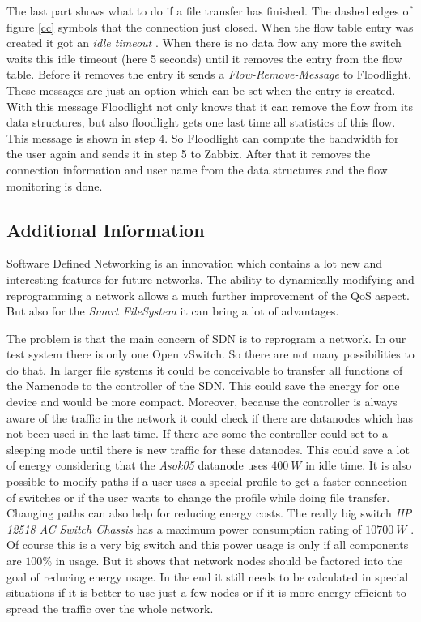 The last part shows what to do if a file transfer has finished. The dashed edges of figure \ref{cc} symbols that the connection just closed. When the flow table entry was created it got an \textit{idle timeout} \cite[p. 11]{ofspec}. When there is no data flow any more the switch waits this idle timeout (here 5 seconds) until it removes the entry from the flow table. Before it removes the entry it sends a \textit{Flow-Remove-Message} \cite[p. 37]{ofspec} to Floodlight. These messages are just an option which can be set when the entry is created. With this message Floodlight not only knows that it can remove the flow from its data structures, but also floodlight gets one last time all statistics of this flow. This message is shown in step 4. So Floodlight can compute the bandwidth for the user again and sends it in step 5 to Zabbix. After that it removes the connection information and user name from the data structures and the flow monitoring is done.

\subsection{Additional Information}

Software Defined Networking is an innovation which contains a lot new and interesting features for future networks. The ability to dynamically modifying and reprogramming a network allows a much further improvement of the QoS aspect. But also for the \textit{Smart FileSystem} it can bring a lot of advantages.

The problem is that the main concern of SDN is to reprogram a network. In our test system there is only one Open vSwitch. So there are not many possibilities to do that. In larger file systems it could be conceivable to transfer all functions of the Namenode to the controller of the SDN. This could save the energy for one device and would be more compact. Moreover, because the controller is always aware of the traffic in the network it could check if there are datanodes which has not been used in the last time. If there are some the controller could set to a sleeping mode until there is new traffic for these datanodes. This could save a lot of energy considering that the \textit{Asok05} datanode uses $400\ W$ in idle time. It is also possible to modify paths if a user uses a special profile to get a faster connection of switches or if the user wants to change the profile while doing file transfer. Changing paths can also help for reducing energy costs. The really big switch \textit{HP 12518 AC Switch Chassis} has a maximum power consumption rating of $10700\ W$ \cite{hp}. Of course this is a very big switch and this power usage is only if all components are $100\%$ in usage. But it shows that network nodes should be factored into the goal of reducing energy usage. In the end it still needs to be calculated in special situations if it is better to use just a few nodes or if it is more energy efficient to spread the traffic over the whole network. 

